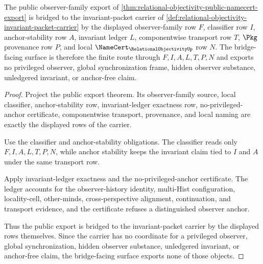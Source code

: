 \begin{theorem}
\label{thm:relational-objectivity-invariant-packet-bridge-surface}
The public observer-family export of \autoref{thm:relational-objectivity-public-namecert-export} is bridged to the invariant-packet carrier of \autoref{def:relational-objectivity-invariant-packet-carrier} by the displayed observer-family row $F$, classifier row $I$, anchor-stability row $A$, invariant ledger $L$, componentwise transport row $T$, $\Pkg$ provenance row $P$, and local $\NameCert_{\RelationalObjectivityUp}$ row $N$. The bridge-facing surface is therefore the finite route through $F,I,A,L,T,P,N$ and exports no privileged observer, global synchronization frame, hidden observer substance, unledgered invariant, or anchor-free claim.
\end{theorem}
\begin{proof}
Project the public export theorem. Its observer-family source, local classifier, anchor-stability row, invariant-ledger exactness row, no-privileged-anchor certificate, componentwise transport, provenance, and local naming are exactly the displayed rows of the carrier.

Use the classifier and anchor-stability obligations. The classifier reads only $F,I,A,L,T,P,N$, while anchor stability keeps the invariant claim tied to $I$ and $A$ under the same transport row.

Apply invariant-ledger exactness and the no-privileged-anchor certificate. The ledger accounts for the observer-history identity, multi-Hist configuration, locality-cell, other-minds, cross-perspective alignment, continuation, and transport evidence, and the certificate refuses a distinguished observer anchor.

Thus the public export is bridged to the invariant-packet carrier by the displayed rows themselves. Since the carrier has no coordinate for a privileged observer, global synchronization, hidden observer substance, unledgered invariant, or anchor-free claim, the bridge-facing surface exports none of those objects.
\end{proof}



